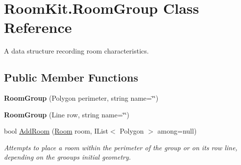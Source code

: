 \hypertarget{class_room_kit_1_1_room_group}{}\section{Room\+Kit.\+Room\+Group Class Reference}
\label{class_room_kit_1_1_room_group}


A data structure recording room characteristics.  


\subsection*{Public Member Functions}
\begin{DoxyCompactItemize}
\item 
\mbox{\label{class_room_kit_1_1_room_group_a0beacdb6f228fcb1f624391f3c68bcdb}} 
{\bfseries Room\+Group} (Polygon perimeter, string name=\char`\"{}\char`\"{})
\item 
\mbox{\label{class_room_kit_1_1_room_group_a9c0eba03b62f1fc908239442c1089415}} 
{\bfseries Room\+Group} (Line row, string name=\char`\"{}\char`\"{})
\item 
bool \mbox{\hyperlink{class_room_kit_1_1_room_group_ae03763e59aac486b0d61709bb7cee038}{Add\+Room}} (\mbox{\hyperlink{class_room_kit_1_1_room}{Room}} room, I\+List$<$ Polygon $>$ among=null)
\begin{DoxyCompactList}\small\item\em Attempts to place a room within the perimeter of the group or on its row line, depending on the grooup\textquotesingle{}s initial geometry. \end{DoxyCompactList}\end{DoxyCompactItemize}
